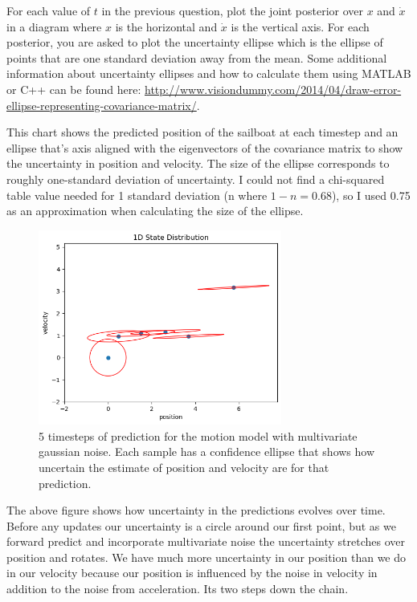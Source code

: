 \documentclass{article}
\begin{document}
For each value of $t$ in the previous question, plot the joint posterior over $x$ and $\dot{x}$ in a diagram where $x$ is the horizontal and $\dot{x}$ is the vertical axis. For each posterior, you are asked to plot the uncertainty ellipse which is the ellipse of points that are one standard deviation away from the mean. Some additional information about uncertainty ellipses and how to calculate them using MATLAB or C++ can be found here: \url{http://www.visiondummy.com/2014/04/draw-error-ellipse-representing-covariance-matrix/}.

This chart shows the predicted position of the sailboat at each timestep and an ellipse that's axis aligned with the eigenvectors of the covariance matrix to show the uncertainty in position and velocity. The size of the ellipse corresponds to roughly one-standard deviation of uncertainty. I could not find a chi-squared table value needed for 1 standard deviation (n where $1-n = 0.68$), so I used 0.75 as an approximation when calculating the size of the ellipse.

\begin{figure}[h]
    \includegraphics[width=8cm]{conf_ellipses.png}
    \centering
    \caption{5 timesteps of prediction for the motion model with multivariate gaussian noise. Each sample has a confidence ellipse that shows how uncertain the estimate of position and velocity are for that prediction.}
\end{figure}

The above figure shows how uncertainty in the predictions evolves over time. Before any updates our uncertainty is a circle around our first point, but as we forward predict and incorporate multivariate noise the uncertainty stretches over position and rotates. We have much more uncertainty in our position than we do in our velocity because our position is influenced by the noise in velocity in addition to the noise from acceleration. Its two steps down the chain.
\end{document}
